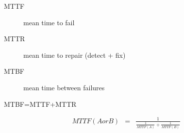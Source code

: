 \documentclass{article}
\begin{document}
\begin{description}
  \item[MTTF] mean time to fail
  \item[MTTR] mean time to repair (detect + fix)
  \item[MTBF] mean time between failures
\end{description}
 
 
 

MTBF=MTTF+MTTR

\begin{eqnarray}
MTTF(A or B)&=& \frac{1}{\frac{1}{MTTF(A)} + \frac{1}{MTTF(B)}}
\end{eqnarray}
\end{document}
